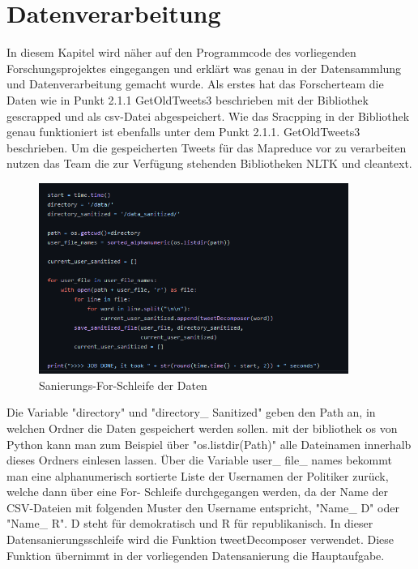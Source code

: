 \section{Datenverarbeitung}
	
	In diesem Kapitel wird näher auf den Programmcode des vorliegenden Forschungsprojektes eingegangen und erklärt was genau in der Datensammlung und 
	Datenverarbeitung gemacht wurde. 
	Als erstes hat das Forscherteam die Daten wie in Punkt 2.1.1 GetOldTweets3 beschrieben mit der Bibliothek gescrapped und als csv-Datei abgespeichert. Wie das Sracpping in 
	der Bibliothek genau funktioniert ist ebenfalls unter dem Punkt 2.1.1. GetOldTweets3 beschrieben. Um die gespeicherten Tweets für das Mapreduce vor zu 
	verarbeiten nutzen das Team die zur Verfügung stehenden Bibliotheken NLTK und cleantext.
	
	
	\begin{figure}[ht]
		\centering
		\includegraphics[width=0.9\textwidth]{images/Kapitel2/Code_Datensanierung_1}
		\caption{\label{fig:DataSan}Sanierungs-For-Schleife der Daten}
	\end{figure}
	
	Die Variable "directory" und "directory\_ Sanitized" geben den Path an, in welchen Ordner die Daten gespeichert werden sollen. mit der bibliothek os von Python 
	kann man zum Beispiel über "os.listdir(Path)" alle Dateinamen innerhalb dieses Ordners einlesen lassen. 
	Über die Variable user\_ file\_ names bekommt man eine alphanumerisch sortierte Liste der Usernamen der Politiker zurück, welche dann über eine For-
	Schleife durchgegangen werden, da der Name der CSV-Dateien mit folgenden Muster den Username entspricht, "Name\_ D" oder "Name\_ R". D steht für demokratisch und R für 
	republikanisch. In dieser Datensanierungsschleife wird die Funktion tweetDecomposer verwendet. Diese Funktion übernimmt in der vorliegenden Datensanierung die 
	Hauptaufgabe.\\
	
